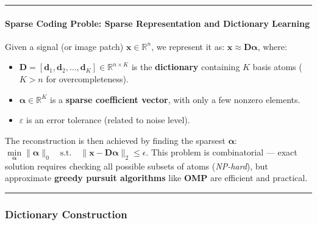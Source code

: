 \documentclass[11pt]{article}
\providecommand{\tightlist}{%
      \setlength{\itemsep}{0pt}\setlength{\parskip}{0pt}}
\begin{document}
\begin{center}\rule{0.5\linewidth}{0.5pt}\end{center}

\hypertarget{sparse-coding-proble-sparse-representation-and-dictionary-learning}{%
\paragraph{\texorpdfstring{\textbf{Sparse Coding Proble: Sparse
Representation and Dictionary
Learning}}{Sparse Coding Proble: Sparse Representation and Dictionary Learning}}\label{sparse-coding-proble-sparse-representation-and-dictionary-learning}}

Given a signal (or image patch) \(\mathbf{x} \in \mathbb{R}^n\), we
represent it as: \(\mathbf{x} \approx \mathbf{D}\boldsymbol{\alpha}\),
where:

\begin{itemize}
\tightlist
\item
  \(\mathbf{D} = [\mathbf{d}_1, \mathbf{d}_2, \ldots, \mathbf{d}_K] \in \mathbb{R}^{n \times K}\)
  is the \textbf{dictionary} containing \(K\) basis atoms (\(K > n\) for
  overcompleteness).
\item
  \(\boldsymbol{\alpha} \in \mathbb{R}^K\) is a \textbf{sparse
  coefficient vector}, with only a few nonzero elements.
\item
  \(\varepsilon\) is an error tolerance (related to noise level).
\end{itemize}

The reconstruction is then achieved by finding the sparsest
\(\boldsymbol{\alpha}\):
\(\underset{\boldsymbol{\alpha}}{\min} \| \boldsymbol{\alpha} \|_0 \quad \text{s.t.} \quad \| \mathbf{x} - \mathbf{D}\boldsymbol{\alpha} \|_2 \leq \epsilon\).
This problem is combinatorial --- exact solution requires checking all
possible subsets of atoms (\emph{NP-hard}), but approximate
\textbf{greedy pursuit algorithms} like \textbf{OMP} are efficient and
practical.

\begin{center}\rule{0.5\linewidth}{0.5pt}\end{center}

\hypertarget{dictionary-construction}{%
\subsubsection{\texorpdfstring{\textbf{Dictionary
Construction}}{Dictionary Construction}}\label{dictionary-construction}}
\end{document}
